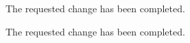\documentclass{response}
\begin{document}
\begin{response}
  The requested change has been completed.
\end{response}


\begin{comment}{Reviewer \#2}
- Page 2: line 45: "in the sense of [9]" --> "in the sense adopted by Lamport [9]"
\end{comment}

\begin{response}
  The requested change has been completed.
\end{response}



\end{document}

